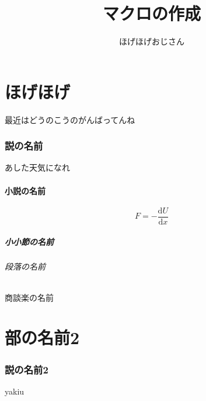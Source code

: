 \documentclass[a4paper, 11pt, uplatex]{jsarticle}
\begin{document}
\title{マクロの作成}
\author{ほげほげおじさん}
\maketitle

\tableofcontents
\clearpage

\part{ほげほげ}
最近はどうのこうのがんばってんね
\section{説の名前}
あした天気になれ
\subsection{小説の名前}


\[
	F = - \frac{\mathrm{d}U}{\mathrm{d}x}
\]

\subsubsection{小小節の名前}
\paragraph{段落の名前}
\subparagraph{商談楽の名前}
\part{部の名前2}
\section{説の名前2}
yakiu

\clearpage



\nocite{*}

\end{document}
